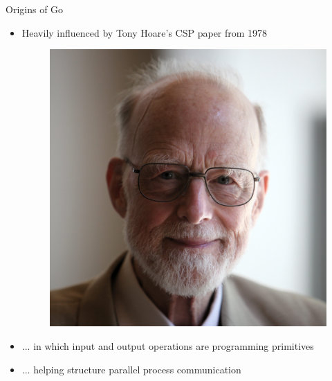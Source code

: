 \documentclass[pdf,xcolor=dvipsnames,noparindent]{beamer}
\begin{document}
\begin{frame}{Origins of Go}
  \pause
  \begin{itemize}
  \item Heavily influenced by Tony Hoare's CSP paper from 1978
    \begin{figure}
      \centering
      \includegraphics[scale = 0.02]{images/hoare.jpg}
    \end{figure}
    \pause
  \item ... in which input and output operations are programming primitives
    \pause
  \item ... helping structure parallel process communication
  \end{itemize}
  
\end{frame}
\end{document}
